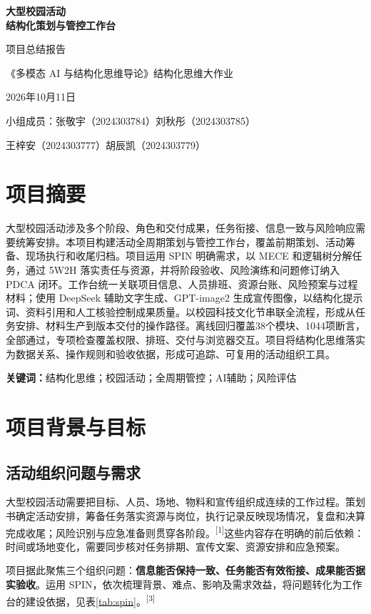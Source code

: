 \documentclass[UTF8,fontset=windows,zihao=-4,a4paper]{ctexart}
\newcommand{\source}[1]{\textsuperscript{[#1]}}
\begin{document}
\begin{center}
{\bfseries\color{ink}大型校园活动\\[4pt]结构化策划与管控工作台}\par
\vspace{9pt}
{\large 项目总结报告}\par
\vspace{8pt}
{\small 《多模态 AI 与结构化思维导论》\quad 结构化思维大作业}\par
{\small 2026年10月11日}\par
{\small 小组成员：张敬宇（2024303784）\quad 刘秋彤（2024303785）}\par
{\small 王梓安（2024303777）\quad 胡辰凯（2024303779）}
\end{center}
\vspace{5pt}
\section*{项目摘要}
大型校园活动涉及多个阶段、角色和交付成果，任务衔接、信息一致与风险响应需要统筹安排。本项目构建活动全周期策划与管控工作台，覆盖前期策划、活动筹备、现场执行和收尾归档。项目运用 SPIN 明确需求，以 MECE 和逻辑树分解任务，通过 5W2H 落实责任与资源，并将阶段验收、风险演练和问题修订纳入 PDCA 闭环。工作台统一关联项目信息、人员排班、资源台账、风险预案与过程材料；使用 DeepSeek 辅助文字生成、GPT-image2 生成宣传图像，以结构化提示词、资料引用和人工核验控制成果质量。以校园科技文化节串联全流程，形成从任务安排、材料生产到版本交付的操作路径。离线回归覆盖38个模块、1044项断言，全部通过，专项检查覆盖权限、排班、交付与浏览器交互。项目将结构化思维落实为数据关系、操作规则和验收依据，形成可追踪、可复用的活动组织工具。

\noindent\textbf{关键词：}结构化思维；校园活动；全周期管控；AI辅助；风险评估

\section{项目背景与目标}
\subsection{活动组织问题与需求}
大型校园活动需要把目标、人员、场地、物料和宣传组织成连续的工作过程。策划书确定活动安排，筹备任务落实资源与岗位，执行记录反映现场情况，复盘和决算完成收尾；风险识别与应急准备则贯穿各阶段。\source{1}这些内容存在明确的前后依赖：时间或场地变化，需要同步核对任务排期、宣传文案、资源安排和应急预案。

项目据此聚焦三个组织问题：\textbf{信息能否保持一致、任务能否有效衔接、成果能否据实验收}。运用 SPIN，依次梳理背景、难点、影响及需求效益，将问题转化为工作台的建设依据，见表\ref{tab:spin}。\source{3}
\end{document}
